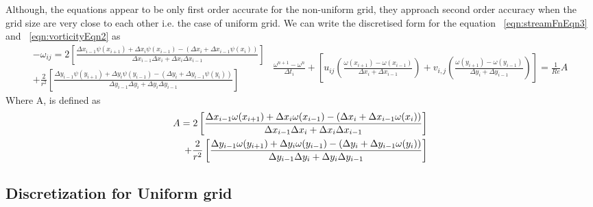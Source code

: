 \documentclass{article}
\begin{document}
Although, the equations appear to be only first order accurate for the non-uniform grid, they approach second order accuracy when the grid size are very close to each other i.e. the case of uniform grid. We can write the discretised form for the equation ~\ref{eqn:streamFnEqn3} and  ~\ref{eqn:vorticityEqn2} as 
\begin{subequations}
\begin{equation}
\begin{split}
\label{eqn:main1}
-\omega_{ij} =2\left[\frac{\Delta x_{i-1} \psi(x_{i+1}) + \Delta x_{i}\psi(x_{i-1}) - (\Delta x_i + \Delta x_{i-1}\psi(x_i))}{\Delta x_{i-1}\Delta x_i +\Delta x_{i} \Delta x_{i-1}} \right]\\+\frac{2}{r^2} \left[\frac{\Delta y_{i-1} \psi(y_{i+1}) + \Delta y_{i}\psi(y_{i-1}) - (\Delta y_i + \Delta y_{i-1}\psi(y_i))}{\Delta y_{i-1}\Delta y_i +\Delta y_{i} \Delta y_{i-1}}\right]
\end{split}
\end{equation}
\begin{equation}
\begin{split}
\label{eqn:main2}
\frac{\omega^{n+1}-\omega^n}{\Delta t_i} + \left[u_{ij}\left(\frac{\omega(x_{i+1})-\omega(x_{i-1})}{\Delta x_i + \Delta x_{i-1}} \right) + v_{i,j}\left(\frac{\omega(y_{i+1})-\omega(y_{i-1})}{\Delta y_i + \Delta y_{i-1}} \right)\right] =  \frac{1}{Re}A
\end{split}
\end{equation}
\end{subequations}
Where A, is defined as  
\begin{equation}
\begin{split}
A = 2\left[\frac{\Delta x_{i-1} \omega(x_{i+1}) + \Delta x_{i}\omega(x_{i-1}) - (\Delta x_i + \Delta x_{i-1}\omega(x_i))}{\Delta x_{i-1}\Delta x_i +\Delta x_{i} \Delta x_{i-1}} \right] \\+\frac{2}{r^2} \left[\frac{\Delta y_{i-1} \omega(y_{i+1}) + \Delta y_{i}\omega(y_{i-1}) - (\Delta y_i + \Delta y_{i-1}\omega(y_i))}{\Delta y_{i-1}\Delta y_i +\Delta y_{i} \Delta y_{i-1}}\right] \notag
\end{split}
\end{equation}



\subsection{Discretization for Uniform grid}
\end{document}
